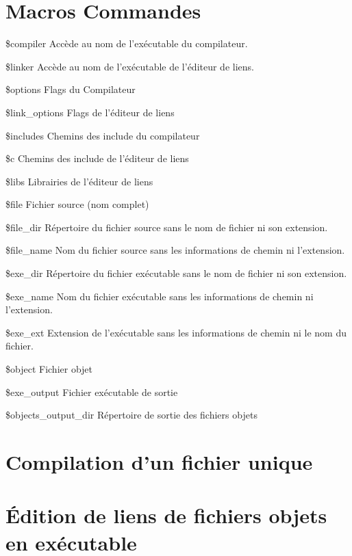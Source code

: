 \section{Macros Commandes}\label{sec:command_macros}

\begin{codeentry}
\item[\$compiler] Accède au nom de l'exécutable du compilateur.
\item[\$linker] Accède au nom de l'exécutable de l'éditeur de liens.
\item[\$options] Flags du Compilateur
\item[\$link\_options] Flags de l'éditeur de liens
\item[\$includes] Chemins des include du compilateur
\item[\$c] Chemins des include de l'éditeur de liens
\item[\$libs] Librairies de l'éditeur de liens
\item[\$file] Fichier source (nom complet)
\item[\$file\_dir] Répertoire du fichier source sans le nom de fichier ni son extension.
\item[\$file\_name] Nom du fichier source sans les informations de chemin ni l'extension.
\item[\$exe\_dir] Répertoire du fichier exécutable sans le nom de fichier ni son extension.
\item[\$exe\_name] Nom du fichier exécutable sans les informations de chemin ni l'extension.
\item[\$exe\_ext] Extension de l'exécutable sans les informations de chemin ni le nom du fichier.
\item[\$object] Fichier objet
\item[\$exe\_output] Fichier exécutable de sortie
\item[\$objects\_output\_dir] Répertoire de sortie des fichiers objets
\end{codeentry}

\section{Compilation d'un fichier unique}


\section{Édition de liens de fichiers objets en exécutable}

